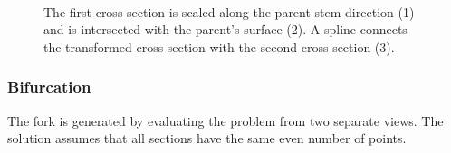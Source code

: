\documentclass[10pt]{article}
\begin{document}
\begin{figure}[H]
\centering
 \\
\caption{The first cross section is scaled along the parent stem direction (1) and is intersected with the parent's surface (2). A spline connects the transformed cross section with the second cross section (3).}
\end{figure}

\subsubsection{Bifurcation}

The fork is generated by evaluating the problem from two separate views. The solution assumes that all sections have the same even number of points.
\end{document}
